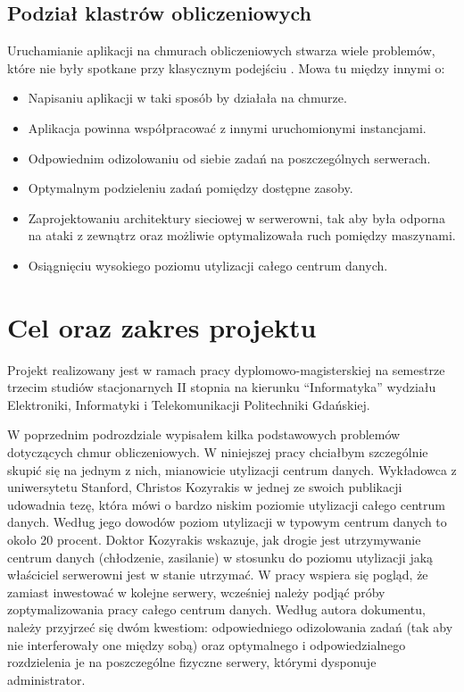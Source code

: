 \documentclass[10pt,a4paper,titlepage,twoside]{report}
\begin{document}
\subsection{Podział klastrów obliczeniowych}\indent \indent Uruchamianie aplikacji na chmurach obliczeniowych stwarza wiele problemów, które nie były spotkane przy klasycznym podejściu \cite{ad14}. Mowa tu między innymi o:
\begin{itemize}
	\item Napisaniu aplikacji w taki sposób by działała na chmurze.
	\item Aplikacja powinna współpracować z innymi uruchomionymi instancjami.
	\item Odpowiednim odizolowaniu od siebie zadań na poszczególnych serwerach.
	\item Optymalnym podzieleniu zadań pomiędzy dostępne zasoby.
	\item Zaprojektowaniu architektury sieciowej w serwerowni, tak aby była odporna na ataki z zewnątrz oraz możliwie optymalizowała ruch pomiędzy maszynami.
	\item Osiągnięciu wysokiego poziomu utylizacji całego centrum danych.
\end{itemize}

\section{Cel oraz zakres projektu}
\indent \indent Projekt realizowany jest w ramach pracy dyplomowo-magisterskiej na semestrze trzecim studiów stacjonarnych II stopnia na kierunku “Informatyka” wydziału Elektroniki, Informatyki i Telekomunikacji Politechniki Gdańskiej.

W poprzednim podrozdziale wypisałem kilka podstawowych problemów dotyczących chmur obliczeniowych. W niniejszej pracy chciałbym szczególnie skupić się na jednym z nich, mianowicie utylizacji centrum danych. Wykładowca z uniwersytetu Stanford, Christos Kozyrakis w jednej ze swoich publikacji \cite{ad3} udowadnia tezę, która mówi o bardzo niskim poziomie utylizacji całego centrum danych. Według jego dowodów poziom utylizacji w typowym centrum danych to około 20 procent. Doktor Kozyrakis wskazuje, jak drogie jest utrzymywanie centrum danych (chłodzenie, zasilanie) w stosunku do poziomu utylizacji jaką właściciel serwerowni jest w stanie utrzymać. W pracy wspiera się pogląd, że zamiast inwestować w kolejne serwery, wcześniej należy podjąć próby zoptymalizowania pracy całego centrum danych. Według autora dokumentu, należy przyjrzeć się dwóm kwestiom: odpowiedniego odizolowania zadań (tak aby nie interferowały one między sobą) oraz optymalnego i odpowiedzialnego rozdzielenia je na poszczególne fizyczne serwery, którymi dysponuje administrator.
\end{document}
